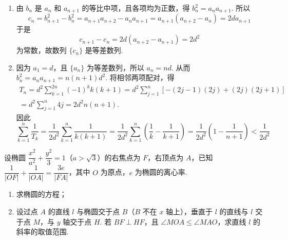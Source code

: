 \begin{solution}
\begin{enumerate}
\item 由 \(b_n\) 是 \(a_n\) 和 \(a_{n+1}\) 的等比中项，且各项均为正数，得
\(b_n^2=a_na_{n+1}\). 所以
\[
c_n=b_{n+1}^2-b_n^2=a_{n+1}a_{n+2}-a_na_{n+1}
 =a_{n+1}(a_{n+2}-a_n)=2d a_{n+1}
\]
于是
\[
c_{n+1}-c_n=2d(a_{n+2}-a_{n+1})=2d^2
\]
为常数，故数列 \(\{c_n\}\) 是等差数列.

\item 因为 \(a_1=d\)，且 \(\{a_n\}\) 为等差数列，所以 \(a_n=nd\). 从而
\(b_n^2=a_na_{n+1}=n(n+1)d^2\). 将相邻两项配对，得
\[
\begin{gathered}
T_n=d^2\sum_{k=1}^{2n}(-1)^k k(k+1)
 =d^2\sum_{j=1}^n\left[-(2j-1)(2j)+(2j)(2j+1)\right]\\
 =d^2\sum_{j=1}^n4j=2d^2n(n+1).
\end{gathered}
\]
因此
\[
\sum_{k=1}^n\frac1{T_k}=\frac1{2d^2}\sum_{k=1}^n\frac1{k(k+1)}
 =\frac1{2d^2}\sum_{k=1}^n\left(\frac1k-\frac1{k+1}\right)
 =\frac1{2d^2}\left(1-\frac1{n+1}\right)<\frac1{2d^2}
\]
\end{enumerate}
\end{solution}

\begin{problem}
设椭圆 \(\dfrac{x^2}{a^2}+\dfrac{y^2}{3}=1\)（\(a>\sqrt3\)）的右焦点为 \(F\)，右顶点为 \(A\)，已知 \(\dfrac1{\lvert OF\rvert}+\dfrac1{\lvert OA\rvert}=\dfrac{3e}{\lvert FA\rvert}\)，其中 \(O\) 为原点，\(e\) 为椭圆的离心率.

\begin{enumerate}
\item 求椭圆的方程；
\item 设过点 \(A\) 的直线 \(l\) 与椭圆交于点 \(B\)（\(B\) 不在 \(x\) 轴上），垂直于 \(l\) 的直线与 \(l\) 交于点 \(M\)，与 \(y\) 轴交于点 \(H\). 若 \(BF\perp HF\)，且 \(\angle MOA\le\angle MAO\)，求直线 \(l\) 的斜率的取值范围.
\end{enumerate}
\end{problem}

